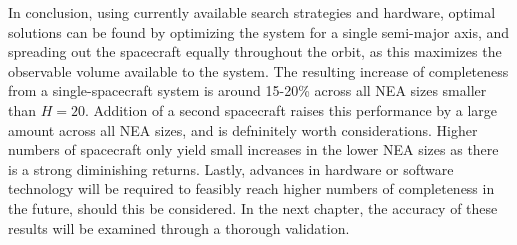In conclusion, using currently available search strategies and hardware, optimal solutions can be found by optimizing the system for a single semi-major axis, and spreading out the spacecraft equally throughout the orbit, as this maximizes the observable volume available to the system. The resulting increase of completeness from a single-spacecraft system is around 15-20\% across all NEA sizes smaller than $H=20$. Addition of a second spacecraft raises this performance by a large amount across all NEA sizes, and is defninitely worth considerations. Higher numbers of spacecraft only yield small increases in the lower NEA sizes as there is a strong diminishing returns. Lastly, advances in hardware or software technology will be required to feasibly reach higher numbers of completeness in the future, should this be considered. In the next chapter, the accuracy of these results will be examined through a thorough validation.
